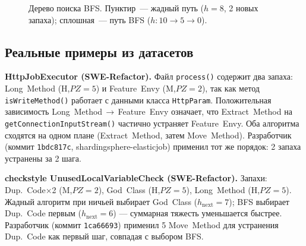 \documentclass[conference]{IEEEtran}
\begin{document}
\begin{figure}[tb]
\centering
{}
\caption{Дерево поиска BFS. Пунктир~--- жадный путь ($h{=}8$,
2 новых запаха); сплошная~--- путь BFS ($h\colon 10 \to 5 \to 0$).}
\label{fig:bfs}
\end{figure}

\subsection{Реальные примеры из датасетов}

\textbf{HttpJobExecutor (SWE-Refactor).}
Файл \texttt{process()} содержит два запаха: Long~Method (H,\;$PZ{=}5$)
и Feature~Envy (M,\;$PZ{=}2$), так как метод \texttt{isWriteMethod()}
работает с данными класса \texttt{HttpParam}.
Положительная зависимость Long~Method\,$\to$\,Feature~Envy означает, что
Extract~Method на \texttt{getConnectionInputStream()} частично устраняет
Feature~Envy.
Оба алгоритма сходятся на одном плане (Extract~Method, затем Move~Method).
Разработчик (коммит \texttt{1bdc817c}, shardingsphere-elasticjob)
применил тот же порядок: 2 запаха устранены за 2 шага.

\textbf{checkstyle UnusedLocalVariableCheck (SWE-Refactor).}
Запахи: Dup.~Code$\times$2 (M,\;$PZ{=}2$), God~Class (H,\;$PZ{=}5$),
Long~Method (H,\;$PZ{=}5$).
Жадный алгоритм при ничьей выбирает God~Class
($h_{\text{next}}{=}7$); BFS выбирает Dup.~Code первым
($h_{\text{next}}{=}6$) --- суммарная тяжесть уменьшается быстрее.
Разработчик (коммит \texttt{1ca66693}) применил 5 Move~Method для
устранения Dup.~Code как первый шаг, совпадая с выбором BFS.
\end{document}
